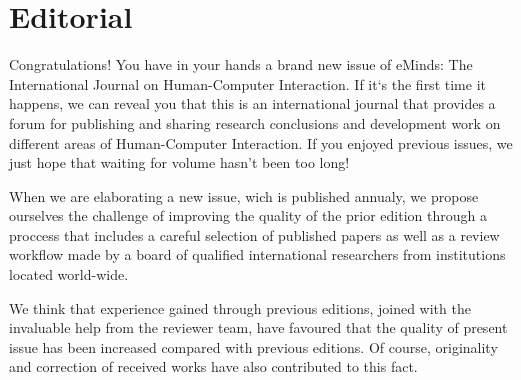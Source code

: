 \chapter*{Editorial}

Congratulations! You have in your hands a brand new issue of eMinds: The International Journal on Human-Computer Interaction. If it`s the first time it happens, we can reveal you that this is an international journal that provides a forum for publishing and sharing  research conclusions and development work on different areas of Human-Computer Interaction. If you enjoyed previous issues, we just hope that waiting for volume hasn't been too long!

When we are elaborating a new issue, wich is published annualy, we propose ourselves the challenge of improving the quality of the prior edition through a  proccess that includes a careful selection of published papers as well as a review  workflow made by a board of qualified international researchers from institutions located world-wide.

We think that experience gained through previous editions, joined with the invaluable help from the reviewer team, have favoured that the quality of present issue has been increased compared with previous editions. Of course, originality and correction of received works have also contributed to this fact.


